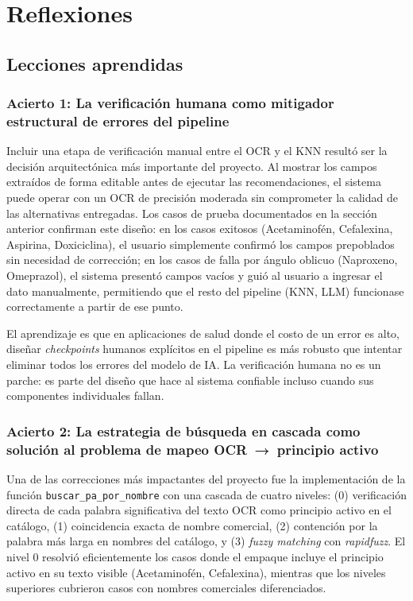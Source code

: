 \section{Reflexiones}


\subsection{Lecciones aprendidas}

\subsubsection*{Acierto 1: La verificación humana como mitigador estructural de errores del pipeline}

Incluir una etapa de verificación manual entre el OCR y el KNN resultó ser la decisión arquitectónica más importante del proyecto. Al mostrar los campos extraídos de forma editable antes de ejecutar las recomendaciones, el sistema puede operar con un OCR de precisión moderada sin comprometer la calidad de las alternativas entregadas. Los casos de prueba documentados en la sección anterior confirman este diseño: en los casos exitosos (Acetaminofén, Cefalexina, Aspirina, Doxiciclina), el usuario simplemente confirmó los campos prepoblados sin necesidad de corrección; en los casos de falla por ángulo oblicuo (Naproxeno, Omeprazol), el sistema presentó campos vacíos y guió al usuario a ingresar el dato manualmente, permitiendo que el resto del pipeline (KNN, LLM) funcionase correctamente a partir de ese punto.

El aprendizaje es que en aplicaciones de salud donde el costo de un error es alto, diseñar \textit{checkpoints} humanos explícitos en el pipeline es más robusto que intentar eliminar todos los errores del modelo de IA. La verificación humana no es un parche: es parte del diseño que hace al sistema confiable incluso cuando sus componentes individuales fallan.

\subsubsection*{Acierto 2: La estrategia de búsqueda en cascada como solución al problema de mapeo OCR~→~principio activo}

Una de las correcciones más impactantes del proyecto fue la implementación de la función \texttt{buscar\_pa\_por\_nombre} con una cascada de cuatro niveles: (0) verificación directa de cada palabra significativa del texto OCR como principio activo en el catálogo, (1) coincidencia exacta de nombre comercial, (2) contención por la palabra más larga en nombres del catálogo, y (3) \textit{fuzzy matching} con \textit{rapidfuzz}. El nivel 0 resolvió eficientemente los casos donde el empaque incluye el principio activo en su texto visible (Acetaminofén, Cefalexina), mientras que los niveles superiores cubrieron casos con nombres comerciales diferenciados.

